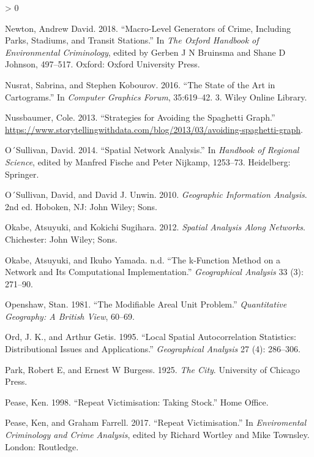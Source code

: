 \documentclass[
  krantz2]{krantz}
\newlength{\cslhangindent}
\newenvironment{CSLReferences}[2] %
 {%
  \setlength{\parindent}{0pt}
  \ifodd #1 \everypar{\setlength{\hangindent}{\cslhangindent}}\ignorespaces\fi
  \ifnum #2 > 0
  \setlength{\parskip}{#2\baselineskip}
  \fi
 }%
 {}
\begin{document}
\begin{CSLReferences}{1}{0}
\leavevmode\hypertarget{ref-Newton_2018}{}%
Newton, Andrew David. 2018. {``Macro-Level Generators of Crime, Including Parks, Stadiums, and Transit Stations.''} In \emph{The Oxford Handbook of Environmental Criminology}, edited by Gerben J N Bruinsma and Shane D Johnson, 497--517. Oxford: Oxford University Press.

\leavevmode\hypertarget{ref-Nusrat_2016}{}%
Nusrat, Sabrina, and Stephen Kobourov. 2016. {``The State of the Art in Cartograms.''} In \emph{Computer Graphics Forum}, 35:619--42. 3. Wiley Online Library.

\leavevmode\hypertarget{ref-Nussbaumer_2013}{}%
Nussbaumer, Cole. 2013. {``Strategies for Avoiding the Spaghetti Graph.''} \url{https://www.storytellingwithdata.com/blog/2013/03/avoiding-spaghetti-graph}.

\leavevmode\hypertarget{ref-OSullivan_2014}{}%
O´Sullivan, David. 2014. {``Spatial Network Analysis.''} In \emph{Handbook of Regional Science}, edited by Manfred Fische and Peter Nijkamp, 1253--73. Heidelberg: Springer.

\leavevmode\hypertarget{ref-OSullivan_2010}{}%
O´Sullivan, David, and David J. Unwin. 2010. \emph{Geographic Information Analysis}. 2nd ed. Hoboken, NJ: John Wiley; Sons.

\leavevmode\hypertarget{ref-Okabe_2012}{}%
Okabe, Atsuyuki, and Kokichi Sugihara. 2012. \emph{Spatial Analysis Along Networks}. Chichester: John Wiley; Sons.

\leavevmode\hypertarget{ref-Okabe_2001}{}%
Okabe, Atsuyuki, and Ikuho Yamada. n.d. {``The k-Function Method on a Network and Its Computational Implementation.''} \emph{Geographical Analysis} 33 (3): 271--90.

\leavevmode\hypertarget{ref-Openshaw_1981}{}%
Openshaw, Stan. 1981. {``The Modifiable Areal Unit Problem.''} \emph{Quantitative Geography: A British View}, 60--69.

\leavevmode\hypertarget{ref-Ord_1995}{}%
Ord, J. K., and Arthur Getis. 1995. {``Local Spatial Autocorrelation Statistics: Distributional Issues and Applications.''} \emph{Geographical Analysis} 27 (4): 286--306.

\leavevmode\hypertarget{ref-Park_1925}{}%
Park, Robert E, and Ernest W Burgess. 1925. \emph{The City}. University of Chicago Press.

\leavevmode\hypertarget{ref-Pease_1998}{}%
Pease, Ken. 1998. {``Repeat Victimisation: Taking Stock.''} Home Office.

\leavevmode\hypertarget{ref-Pease_2017}{}%
Pease, Ken, and Graham Farrell. 2017. {``Repeat Victimisation.''} In \emph{Enviromental Criminology and Crime Analysis}, edited by Richard Wortley and Mike Townsley. London: Routledge.


\end{CSLReferences}
\end{document}
